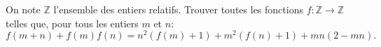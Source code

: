 On note $\mathbb{Z}$ l'ensemble des entiers relatifs.
Trouver toutes les fonctions $f\colon\mathbb{Z}\to\mathbb{Z}$ telles que, pour tous les entiers $m$ et $n$:
\[
    f(m + n) + f(m)f(n) = n^2(f(m) + 1) + m^2(f(n) + 1) + mn(2 - mn).
\]

